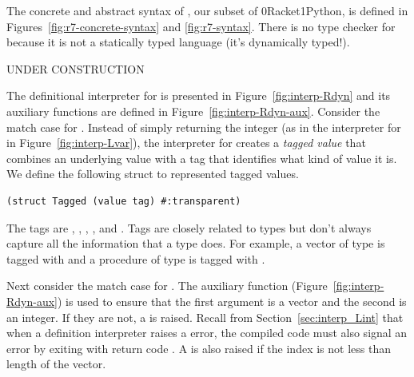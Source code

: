 \documentclass[7x10,nocrop]{TimesAPriori_MIT}%
\def\racketEd{0}
\def\pythonEd{1}
\def\edition{1}
\newcommand{\racket}[1]{{\if\edition\racketEd{#1}\fi}}
\newcommand{\python}[1]{{\if\edition\pythonEd #1\fi}}
\begin{document}
The concrete and abstract syntax of \LangDyn{}, our subset of
\racket{Racket}\python{Python}, is defined in
Figures~\ref{fig:r7-concrete-syntax} and \ref{fig:r7-syntax}.
%
There is no type checker for \LangDyn{} because it is not a statically
typed language (it's dynamically typed!).

UNDER CONSTRUCTION

The definitional interpreter for \LangDyn{} is presented in
Figure~\ref{fig:interp-Rdyn} and its auxiliary functions are defined in
Figure~\ref{fig:interp-Rdyn-aux}. Consider the match case for
.  Instead of simply returning the integer  (as
in the interpreter for \LangVar{} in Figure~\ref{fig:interp-Lvar}), the
interpreter for \LangDyn{} creates a \emph{tagged value} that combines an underlying value with a tag that identifies
what kind of value it is. We define the following struct
to represented tagged values.
\begin{lstlisting}
(struct Tagged (value tag) #:transparent)
\end{lstlisting}
The tags are , , ,
, and . Tags are closely related to types
but don't always capture all the information that a type does. For
example, a vector of type  is tagged with
 and a procedure of type 
is tagged with .

Next consider the match case for .  The
 auxiliary function (Figure~\ref{fig:interp-Rdyn-aux})
is used to ensure that the first argument is a vector and the second
is an integer. If they are not, a  is raised.
Recall from Section~\ref{sec:interp_Lint} that when a definition
interpreter raises a  error, the compiled code
must also signal an error by exiting with return code .  A
 is also raised if the index is not less than
length of the vector.
\end{document}
